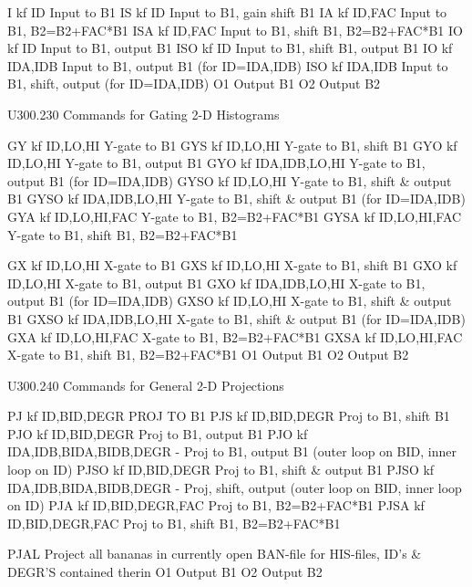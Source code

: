    I    kf ID            Input to B1
   IS   kf ID            Input to B1, gain shift B1
   IA   kf ID,FAC        Input to B1, B2=B2+FAC*B1
   ISA  kf ID,FAC        Input to B1, shift  B1, B2=B2+FAC*B1
   IO   kf ID            Input to B1, output B1
   ISO  kf ID            Input to B1, shift  B1, output B1
   IO   kf IDA,IDB       Input to B1, output B1     (for ID=IDA,IDB)
   ISO  kf IDA,IDB       Input to B1, shift, output (for ID=IDA,IDB)
   O1                    Output B1
   O2                    Output B2
 
   U300.230  Commands for Gating 2-D Histograms
 
   GY   kf ID,LO,HI      Y-gate to B1
   GYS  kf ID,LO,HI      Y-gate to B1, shift  B1
   GYO  kf ID,LO,HI      Y-gate to B1, output B1
   GYO  kf IDA,IDB,LO,HI Y-gate to B1,         output B1 (for ID=IDA,IDB)
   GYSO kf ID,LO,HI      Y-gate to B1, shift & output B1
   GYSO kf IDA,IDB,LO,HI Y-gate to B1, shift & output B1 (for ID=IDA,IDB)
   GYA  kf ID,LO,HI,FAC  Y-gate to B1, B2=B2+FAC*B1
   GYSA kf ID,LO,HI,FAC  Y-gate to B1, shift B1, B2=B2+FAC*B1
 
   GX   kf ID,LO,HI      X-gate to B1
   GXS  kf ID,LO,HI      X-gate to B1, shift  B1
   GXO  kf ID,LO,HI      X-gate to B1, output B1
   GXO  kf IDA,IDB,LO,HI X-gate to B1,         output B1 (for ID=IDA,IDB)
   GXSO kf ID,LO,HI      X-gate to B1, shift & output B1
   GXSO kf IDA,IDB,LO,HI X-gate to B1, shift & output B1 (for ID=IDA,IDB)
   GXA  kf ID,LO,HI,FAC  X-gate to B1, B2=B2+FAC*B1
   GXSA kf ID,LO,HI,FAC  X-gate to B1, shift B1, B2=B2+FAC*B1
   O1                    Output B1
   O2                    Output B2
 
   U300.240  Commands for General 2-D Projections
 
   PJ   kf ID,BID,DEGR               PROJ TO B1
   PJS  kf ID,BID,DEGR               Proj to B1, shift  B1
   PJO  kf ID,BID,DEGR               Proj to B1, output B1
   PJO  kf IDA,IDB,BIDA,BIDB,DEGR -  Proj to B1, output B1
                                     (outer loop on BID, inner loop on ID)
   PJSO kf ID,BID,DEGR               Proj to B1, shift & output B1
   PJSO kf IDA,IDB,BIDA,BIDB,DEGR -  Proj, shift, output
                                     (outer loop on BID, inner loop on ID)
   PJA  kf ID,BID,DEGR,FAC           Proj to B1, B2=B2+FAC*B1
   PJSA kf ID,BID,DEGR,FAC           Proj to B1, shift B1, B2=B2+FAC*B1
 
   PJAL                              Project all bananas in currently open
                                     BAN-file for HIS-files, ID's & DEGR'S
                                     contained therin
   O1                                Output B1
   O2                                Output B2
 
